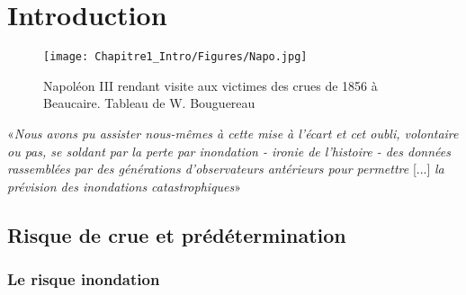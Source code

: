 %
%
%
%
%
%
%

\chapter*{Introduction}
\label{chap:intro}

\begin{figure}[h]
	\centering
		\texttt{[image: Chapitre1\_Intro/Figures/Napo.jpg]}
        \caption{Napoléon III rendant visite aux victimes des crues de 1856 à Beaucaire. Tableau de W. Bouguereau}	
\end{figure}

	\epigraph{«\textit{Nous avons pu assister nous-mêmes à cette mise à l'écart et cet oubli, volontaire ou pas, se soldant par la perte par inondation - ironie de l'histoire - des données rassemblées par des générations d'observateurs antérieurs pour permettre} [...] \textit{la prévision des inondations catastrophiques}»}{\citet{pichard_sept_2014}}

\newpage

\section*{Risque de crue et prédétermination}

	\subsection*{Le risque inondation}
